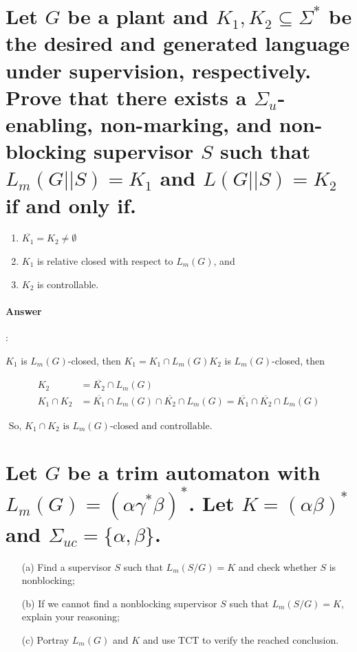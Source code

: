 \documentclass{article}
\begin{document}

\section{Let $G$ be a plant and $K_1,K_2 \subseteq \Sigma^*$ be the desired and generated language under supervision, respectively. Prove that there exists a $\Sigma_u$-enabling, non-marking, and non-blocking supervisor $S$ such that $L_m(G||S) =K_1$ and $L(G||S) = K_2$ if and only if.}
\begin{enumerate}
  \item $\overline{K_1}=K_2 \neq \emptyset$
  \item $K_1$ is relative closed with respect to $L_m(G)$, and
  \item $K_2$ is controllable.
\end{enumerate}

\paragraph{Answer}:

$K_1$ is $L_m(G)$-closed, then $K_1=K_1 \cap L_m(G) K_2$ is $L_m(G)$-closed, then

\begin{equation*}
  \begin{aligned}
  K_2&=\overline{K_2} \cap L_m(G) \\
   K_1 \cap K_2&=\overline{K_1} \cap L_m(G) \cap \overline{K_2} \cap L_m(G)=\overline{K_1} \cap \overline{K_2} \cap L_m(G)
  \end{aligned}
\end{equation*}

$\text { So, } K_1 \cap K_2 \text { is } L_m(G) \text {-closed and controllable. }$

\section{Let $G$ be a trim automaton with $L_m(G)=\left(\alpha \gamma^* \beta\right)^*$. Let $K=(\alpha \beta)^*$ and $\Sigma_{u c}=\{\alpha, \beta\}$. }

\begin{enumerate}
  \item[(a)] Find a supervisor $S$ such that $L_m(S / G)=K$ and check whether $S$ is nonblocking;
  \item[(b)] If we cannot find a nonblocking supervisor $S$ such that $L_m(S / G)=K$, explain your reasoning;
  \item[(c)] Portray $L_m(G)$ and $K$ and use TCT to verify the reached conclusion.
\end{enumerate}
\end{document}

